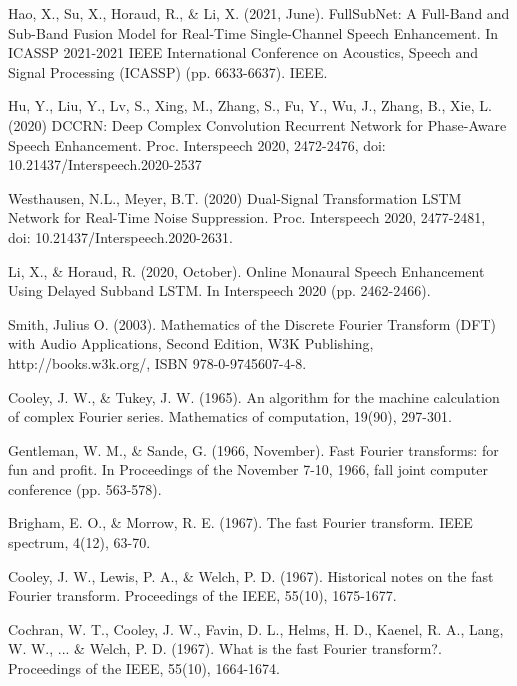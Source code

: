 \documentclass[a4paper, oneside, 13pt]{book}
\begin{document}
\begin{thebibliography}{80}
	
	Hao, X., Su, X., Horaud, R., \& Li, X. (2021, June). FullSubNet: A Full-Band and Sub-Band Fusion Model for Real-Time Single-Channel Speech Enhancement. In ICASSP 2021-2021 IEEE International Conference on Acoustics, Speech and Signal Processing (ICASSP) (pp. 6633-6637). IEEE.
	
	Hu, Y., Liu, Y., Lv, S., Xing, M., Zhang, S., Fu, Y., Wu, J., Zhang, B., Xie, L. (2020) DCCRN: Deep Complex Convolution Recurrent Network for Phase-Aware Speech Enhancement. Proc. Interspeech 2020, 2472-2476, doi: 10.21437/Interspeech.2020-2537
	
	Westhausen, N.L., Meyer, B.T. (2020) Dual-Signal Transformation LSTM Network for Real-Time Noise Suppression. Proc. Interspeech 2020, 2477-2481, doi: 10.21437/Interspeech.2020-2631.
	
	
	
	Li, X., \& Horaud, R. (2020, October). Online Monaural Speech Enhancement Using Delayed Subband LSTM. In Interspeech 2020 (pp. 2462-2466).
	
	
	
	Smith, Julius O. (2003). Mathematics of the Discrete Fourier Transform (DFT) with Audio Applications, Second Edition, W3K Publishing, http://books.w3k.org/, ISBN 978-0-9745607-4-8.
	
	
	Cooley, J. W., \& Tukey, J. W. (1965). An algorithm for the machine calculation of complex Fourier series. Mathematics of computation, 19(90), 297-301.
	
	Gentleman, W. M., \& Sande, G. (1966, November). Fast Fourier transforms: for fun and profit. In Proceedings of the November 7-10, 1966, fall joint computer conference (pp. 563-578).
	
	Brigham, E. O., \& Morrow, R. E. (1967). The fast Fourier transform. IEEE spectrum, 4(12), 63-70.
	
	Cooley, J. W., Lewis, P. A., \& Welch, P. D. (1967). Historical notes on the fast Fourier transform. Proceedings of the IEEE, 55(10), 1675-1677.
	
	Cochran, W. T., Cooley, J. W., Favin, D. L., Helms, H. D., Kaenel, R. A., Lang, W. W., ... \& Welch, P. D. (1967). What is the fast Fourier transform?. Proceedings of the IEEE, 55(10), 1664-1674.
	

\end{thebibliography}
\end{document}
